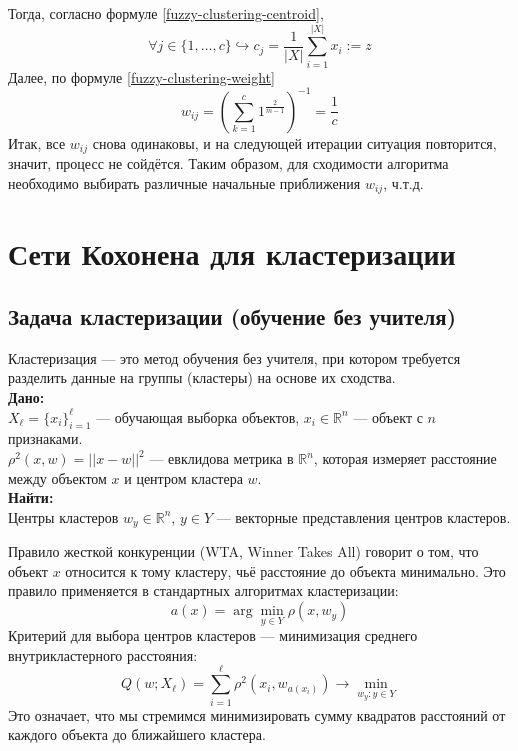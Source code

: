 \begin{itemize}
        Тогда, согласно формуле \eqref{fuzzy-clustering-centroid},
        \begin{equation*}
            \forall j \in \{1, \ldots, c\} \hookrightarrow c_j =
            \frac{1}{|X|}\sum\limits_{i = 1}^{|X|} x_i := z
        \end{equation*}
        Далее, по формуле \eqref{fuzzy-clustering-weight}
        \begin{equation*}
            w_{ij} = \left(\sum\limits_{k = 1}^{c} 1^{\frac{2}{m - 1}}\right)^{-1} = \frac{1}{c}
        \end{equation*}
        Итак, все $w_{ij}$ снова одинаковы, и на следующей итерации ситуация повторится, значит,
        процесс не сойдётся. Таким образом, для сходимости алгоритма необходимо выбирать различные
        начальные приближения $w_{ij}$, ч.т.д.


\section{Сети Кохонена для кластеризации}

\subsection{Задача кластеризации (обучение без учителя)}
Кластеризация — это метод обучения без учителя, при котором требуется разделить данные на группы (кластеры) на основе их сходства.  \\
\textbf{Дано:}  \\
$X_\ell = \{ x_i \}_{i=1}^{\ell}$ — обучающая выборка объектов, $x_i \in \mathbb{R}^n$ — объект с $n$ признаками.\\
$\rho^2(x, w) = || x - w ||^2$ — евклидова метрика в $\mathbb{R}^n$, которая измеряет расстояние между объектом $x$ и центром кластера $w$.\\

\textbf{Найти:} \\
Центры кластеров $w_y \in \mathbb{R}^n$, $y \in Y$ — векторные представления центров кластеров.

Правило жесткой конкуренции (WTA, Winner Takes All) говорит о том, что объект $x$ относится к тому кластеру, чьё расстояние до объекта минимально. Это правило применяется в стандартных алгоритмах кластеризации:
\[
a(x) = \arg \min_{y \in Y} \rho(x, w_y)
\]
Критерий для выбора центров кластеров — минимизация среднего внутрикластерного расстояния:
\[
Q(w; X_\ell) = \sum_{i=1}^{\ell} \rho^2(x_i, w_{a(x_i)}) \to \min_{w_y : y \in Y}
\]
Это означает, что мы стремимся минимизировать сумму квадратов расстояний от каждого объекта до ближайшего кластера.


\end{itemize}
